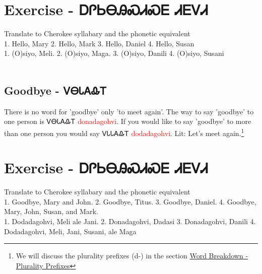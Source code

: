\section{Exercise - ᎠᎵᏏᎾᎯᏍᏗᏍᎬ ᏗᎬᏙᏗ}
Translate to Cherokee syllabary and the phonetic equivalent\\
1. Hello, Mary 2. Hello, Mark 3. Hello, Daniel 4. Hello, Susan\\
1. (O)siyo, Meli. 2. (O)siyo, Maga. 3. (O)siyo, Danili 4. (O)siyo, Susani\\
\
\subsection{Goodbye - ᏙᎾᏓᎪᎲᎢ}
There is no word for 'goodbye' only 'to meet again'. The way to say 'goodbye' to one person is ᏙᎾᏓᎪᎲᎢ \textcolor{red}{donadagohvi}. If you would like to say 'goodbye' to more than one person you would say ᏙᏓᏓᎪᎲᎢ \textcolor{red}{dodadagohvi}.  Lit: Let's meet again.\footnote{We will discuss the plurality prefixes (d-) in the section \hyperref[sec:wordBreakdownPluralityPrefixes]{Word Breakdown - Plurality Prefixes}}
\section{Exercise - ᎠᎵᏏᎾᎯᏍᏗᏍᎬ ᏗᎬᏙᏗ}
Translate to Cherokee syllabary and the phonetic equivalent\\
1. Goodbye, Mary and John. 2. Goodbye, Titus. 3. Goodbye, Daniel. 4. Goodbye, Mary, John, Susan, and Mark.\\
1. Dodadagohvi, Meli ale Jani. 2. Donadagohvi, Dadasi 3. Donadagohvi, Danili 4. Dodadagohvi, Meli, Jani, Susani, ale Maga\\

